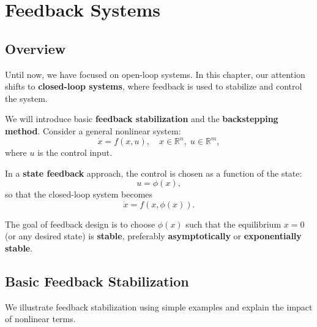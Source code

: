 \chapterspaceabove{6.75cm} %
\chapterspacebelow{7.25cm} %

\chapter{Feedback Systems}

\section{Overview}

Until now, we have focused on open-loop systems. In this chapter, our attention shifts to \textbf{closed-loop systems}, where feedback is used to stabilize and control the system.  

We will introduce basic \textbf{feedback stabilization} and the \textbf{backstepping method}. Consider a general nonlinear system:
\begin{equation}
\dot{x} = f(x,u), \quad x \in \mathbb{R}^n, \; u \in \mathbb{R}^m,
\end{equation}
where \(u\) is the control input.  

In a \textbf{state feedback} approach, the control is chosen as a function of the state:
\begin{equation}
u = \phi(x),
\end{equation}
so that the closed-loop system becomes
\begin{equation}
\dot{x} = f(x, \phi(x)).
\end{equation}

The goal of feedback design is to choose \(\phi(x)\) such that the equilibrium \(x=0\) (or any desired state) is \textbf{stable}, preferably \textbf{asymptotically} or \textbf{exponentially stable}.

\section{Basic Feedback Stabilization}

We illustrate feedback stabilization using simple examples and explain the impact of nonlinear terms.  

